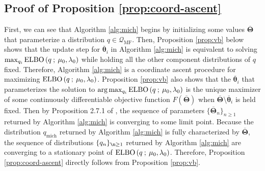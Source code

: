 \subsection{Proof of Proposition \ref{prop:coord-ascent}}
\label{app:prop1-proof}

First, we can see that Algorithm \ref{alg:mich} begins by initializing some values $\overline{\boldsymbol{\Theta}}$ that parameterize a distribution $q\in\mathcal{Q}_{\text{MF}}$. Then, Proposition \ref{prop:vb} below shows that the update step for $\overline{\boldsymbol{\theta}}_i$ in Algorithm \ref{alg:mich} is equivalent to solving $\max_{q_i} \text{\normalfont ELBO}\left(q\:;\:\mu_0,\lambda_0\right)$ while holding all the other component distributions of $q$ fixed. Therefore, Algorithm \ref{alg:mich} is a coordinate ascent procedure for maximizing $\text{\normalfont ELBO}\left(q\:;\:\mu_0,\lambda_0\right)$. Proposition \ref{prop:vb} also shows that the $\overline{\boldsymbol{\theta}}_i$ that parameterizes the solution to $\text{arg}\max_{q_i} \text{\normalfont ELBO}\left(q\:;\:\mu_0,\lambda_0\right)$ is the unique maximizer of some continuously differentiable objective function $F(\overline{\boldsymbol{\Theta}})$ when $\overline{\boldsymbol{\Theta}}\setminus\overline{\boldsymbol{\theta}}_i$ is held fixed. Then by Proposition 2.7.1 of \cite{Bertsekas97}, the sequence of parameters $\{\overline{\boldsymbol{\Theta}}_{n}\}_{n\geq 1}$ returned by Algorithm \ref{alg:mich} is converging to some limit point. Because the distribution $q_{\text{mich}}$ returned by Algorithm \ref{alg:mich} is fully characterized by $\overline{\boldsymbol{\Theta}}$, the sequence of distributions $\{q_{n}\}_{\n \geq 1}$ returned by Algorithm \ref{alg:mich} are converging to a stationary point of $\text{\normalfont ELBO}\left(q\:;\:\mu_0,\lambda_0\right)$. Therefore, Proposition \ref{prop:coord-ascent} directly follows from Proposition \ref{prop:vb}.

